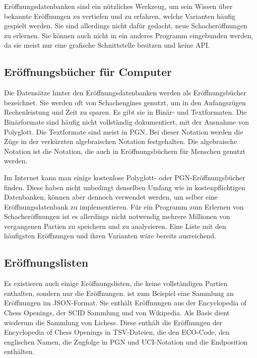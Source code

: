 Eröffnungsdatenbanken sind ein nützliches Werkzeug, um sein Wissen über bekannte Eröffnungen zu vertiefen und zu erfahren, welche Varianten häufig gespielt werden. Sie sind allerdings nicht dafür gedacht, neue Schacheröffnungen zu erlernen. Sie können auch nicht in ein anderes Programm eingebunden werden, da sie meist nur eine grafische Schnittstelle besitzen und keine \ac{API}.

\subsection{Eröffnungsbücher für Computer}
Die Datensätze hinter den Eröffnungsdatenbanken werden als Eröffnungsbücher bezeichnet. Sie werden oft von Schachengines genutzt, um in den Anfangszügen Rechenleistung und Zeit zu sparen. Es gibt sie in Binär- und Textformaten. Die Binärformate sind häufig nicht vollständig dokumentiert, mit der Ausnahme von Polyglott. Die Textformate sind meist in \ac{PGN}.
Bei dieser Notation werden die Züge in der verkürzten algebraischen Notation festgehalten. Die algebraische Notation ist die Notation, die auch in Eröffnungsbüchern für Menschen genutzt werden.
\cite{wikipedia_foundation_inc_chess_2025}

Im Internet kann man einige kostenlose Polyglott- oder PGN-Eröffnungsbücher finden. Diese haben nicht unbedingt denselben Umfang wie in kostenpflichtigen Datenbanken, können aber dennoch verwendet werden, um selber eine Eröffnungsdatenbank zu implementieren. Für ein Programm zum Erlernen von Schacheröffnungen ist es allerdings nicht notwendig mehrere Millionen von vergangenen Partien zu speichern und zu analysieren. Eine Liste mit den häufigsten Eröffnungen und ihren Varianten wäre bereits ausreichend.

\subsection{Eröffnungslisten}
Es existieren auch einige Eröffnungslisten, die keine vollständigen Partien enthalten, sondern nur die Eröffnungen. \cite{omur_yanikoglu_ecojson_2025} ist zum Beispiel eine Sammlung an Eröffnungen im JSON-Format. Sie enthält Eröffnungen aus der Encyclopedia of Chess Openings, der SCID Sammlung und von Wikipedia. Als Basis dient wiederum die Sammlung \cite{lichessorg_chess-openings_2025} von Lichess. Diese enthält die Eröffnungen der Encyclopedia of Chess Openings in TSV-Dateien, die den ECO-Code, den englischen Namen, die Zugfolge in \ac{PGN} und \ac{UCI}-Notation und die Endposition enthälten.

